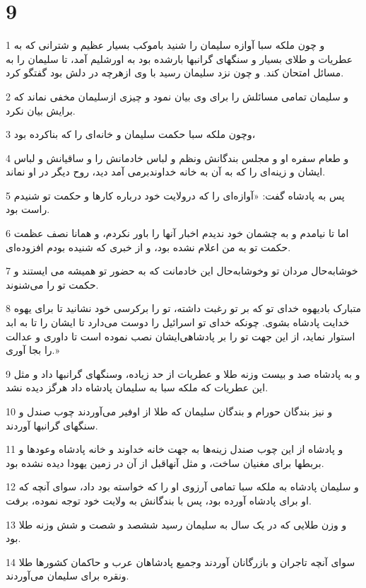 \chapter{9}

\par 1 و چون ملکه سبا آوازه سلیمان را شنید باموکب بسیار عظیم و شترانی که به عطریات و طلای بسیار و سنگهای گرانبها بارشده بود به اورشلیم آمد، تا سلیمان را به مسائل امتحان کند. و چون نزد سلیمان رسید با وی ازهرچه در دلش بود گفتگو کرد.
\par 2 و سلیمان تمامی مسائلش را برای وی بیان نمود و چیزی ازسلیمان مخفی نماند که برایش بیان نکرد.
\par 3 وچون ملکه سبا حکمت سلیمان و خانه‌ای را که بناکرده بود،
\par 4 و طعام سفره او و مجلس بندگانش ونظم و لباس خادمانش را و ساقیانش و لباس ایشان و زینه‌ای را که به آن به خانه خداوندبرمی آمد دید، روح دیگر در او نماند.
\par 5 پس به پادشاه گفت: «آوازه‌ای را که درولایت خود درباره کارها و حکمت تو شنیدم راست بود.
\par 6 اما تا نیامدم و به چشمان خود ندیدم اخبار آنها را باور نکردم، و همانا نصف عظمت حکمت تو به من اعلام نشده بود، و از خبری که شنیده بودم افزوده‌ای.
\par 7 خوشابه‌حال مردان تو وخوشابه‌حال این خادمانت که به حضور تو همیشه می ایستند و حکمت تو را می‌شنوند.
\par 8 متبارک بادیهوه خدای تو که بر تو رغبت داشته، تو را برکرسی خود نشانید تا برای یهوه خدایت پادشاه بشوی. چونکه خدای تو اسرائیل را دوست می‌دارد تا ایشان را تا به ابد استوار نماید، از این جهت تو را بر پادشاهی‌ایشان نصب نموده است تا داوری و عدالت را بجا آوری.»
\par 9 و به پادشاه صد و بیست وزنه طلا و عطریات از حد زیاده، وسنگهای گرانبها داد و مثل این عطریات که ملکه سبا به سلیمان پادشاه داد هرگز دیده نشد.
\par 10 و نیز بندگان حورام و بندگان سلیمان که طلا از اوفیر می‌آوردند چوب صندل و سنگهای گرانبها آوردند.
\par 11 و پادشاه از این چوب صندل زینه‌ها به جهت خانه خداوند و خانه پادشاه وعودها و بربطها برای مغنیان ساخت، و مثل آنهاقبل از آن در زمین یهودا دیده نشده بود.
\par 12 و سلیمان پادشاه به ملکه سبا تمامی آرزوی او را که خواسته بود داد، سوای آنچه که او برای پادشاه آورده بود، پس با بندگانش به ولایت خود توجه نموده، برفت.
\par 13 و وزن طلایی که در یک سال به سلیمان رسید ششصد و شصت و شش وزنه طلا بود.
\par 14 سوای آنچه تاجران و بازرگانان آوردند وجمیع پادشاهان عرب و حاکمان کشورها طلا ونقره برای سلیمان می‌آوردند.
